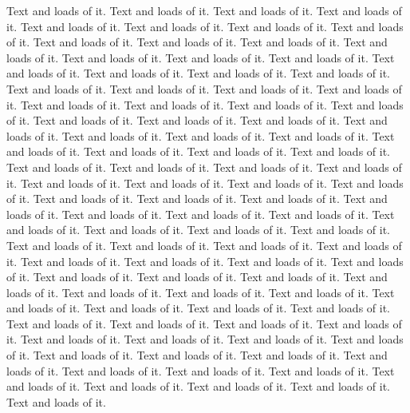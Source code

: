 \documentclass{exampaper}
\begin{document}
Text and loads of it.  Text and loads of it.  Text and loads of it.  Text and loads of it.  Text and loads of it.  Text and loads of it.  Text and loads of it.  Text and loads of it.  Text and loads of it.  Text and loads of it.  Text and loads of it.  Text and loads of it.  Text and loads of it.  Text and loads of it.  Text and loads of it.  Text and loads of it.  Text and loads of it.  Text and loads of it.  Text and loads of it.  Text and loads of it.  Text and loads of it.  Text and loads of it.  Text and loads of it.  Text and loads of it.  Text and loads of it.  Text and loads of it.  Text and loads of it.  Text and loads of it.  Text and loads of it.  Text and loads of it.  Text and loads of it.  Text and loads of it.  Text and loads of it.  Text and loads of it.  Text and loads of it.  Text and loads of it.  Text and loads of it.  Text and loads of it.  Text and loads of it.  Text and loads of it.  Text and loads of it.  Text and loads of it.  Text and loads of it.  Text and loads of it.  Text and loads of it.  Text and loads of it.  Text and loads of it.  Text and loads of it. 
Text and loads of it.  Text and loads of it.  Text and loads of it.  Text and loads of it.  Text and loads of it.  Text and loads of it.  Text and loads of it.  Text and loads of it.  Text and loads of it.  Text and loads of it.  Text and loads of it.  Text and loads of it.  Text and loads of it.  Text and loads of it.  Text and loads of it.  Text and loads of it.  Text and loads of it.  Text and loads of it.  Text and loads of it.  Text and loads of it.  Text and loads of it.  Text and loads of it.  Text and loads of it.  Text and loads of it.  Text and loads of it.  Text and loads of it.  Text and loads of it.  Text and loads of it.  Text and loads of it.  Text and loads of it.  Text and loads of it.  Text and loads of it.  Text and loads of it.  Text and loads of it.  Text and loads of it.  Text and loads of it.  Text and loads of it.  Text and loads of it.  Text and loads of it.  Text and loads of it.  Text and loads of it.  Text and loads of it.  Text and loads of it.  Text and loads of it.  Text and loads of it.  Text and loads of it.  Text and loads of it.  Text and loads of it. 
\end{document}
